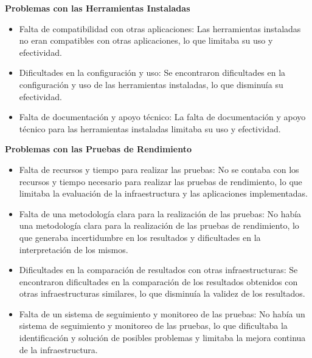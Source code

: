 \begin{spacing}{1.5}
  \textbf{Problemas con las Herramientas Instaladas}

  \begin{itemize}
    \item Falta de compatibilidad con otras aplicaciones: Las herramientas
          instaladas no eran compatibles con otras aplicaciones, lo que
          limitaba su uso y
          efectividad.
    \item Dificultades en la configuración y uso: Se encontraron
          dificultades en la configuración y uso de las herramientas
          instaladas, lo que
          disminuía su efectividad.
    \item Falta de documentación y apoyo técnico: La falta de documentación
          y apoyo técnico para las herramientas instaladas limitaba su uso y
          efectividad.
  \end{itemize}

  \textbf{Problemas con las Pruebas de Rendimiento}

  \begin{itemize}
    \item Falta de recursos y tiempo para realizar las pruebas: No se
          contaba con los recursos y tiempo necesario para realizar las pruebas
          de
          rendimiento, lo que limitaba la evaluación de la infraestructura y
          las
          aplicaciones implementadas.
    \item Falta de una metodología clara para la realización de las
          pruebas: No había una metodología clara para la realización de las
          pruebas de
          rendimiento, lo que generaba incertidumbre en los resultados y
          dificultades en
          la interpretación de los mismos.
    \item Dificultades en la comparación de resultados con otras
          infraestructuras: Se encontraron dificultades en la comparación de
          los
          resultados obtenidos con otras infraestructuras similares, lo que
          disminuía la
          validez de los resultados.
    \item Falta de un sistema de seguimiento y monitoreo de las pruebas: No
          había un sistema de seguimiento y monitoreo de las pruebas, lo que
          dificultaba
          la identificación y solución de posibles problemas y limitaba la
          mejora
          continua de la infraestructura.
  \end{itemize}

  \mylinespacing
  \mylinespacing
  \begin{tightcenter}
  \end{tightcenter}
\end{spacing}